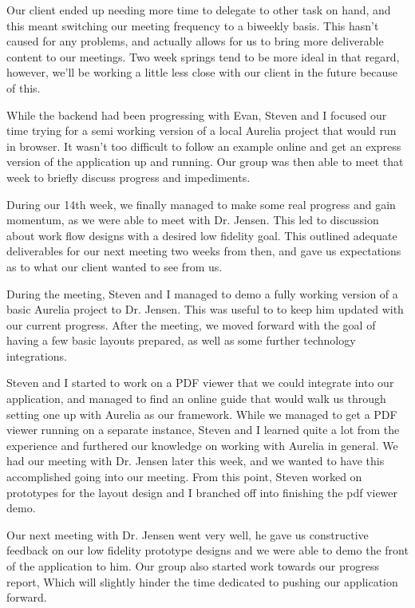 \documentclass[onecolumn, draftclsnofoot,10pt, compsoc]{IEEEtran}
\begin{document}
Our client ended up needing more time to delegate to other task on hand, and this meant 
switching our meeting frequency to a biweekly basis. This hasn't caused for any problems,
and actually allows for us to bring more deliverable content to our meetings. Two week 
springs tend to be more ideal in that regard, however, we'll be working a little less 
close with our client in the future because of this. 

While the backend had been progressing with Evan, Steven and I focused our time trying for 
a semi working version of a local Aurelia project that would run in browser. It wasn't too
difficult to follow an example online and get an express version of the application up and 
running. Our group was then able to meet that week to briefly discuss progress and 
impediments. 

During our 14th week, we finally managed to make some real progress and gain momentum, as 
we were able to meet with Dr. Jensen. This led to discussion about work flow designs with a 
desired low fidelity goal. This outlined adequate deliverables for our next meeting two weeks 
from then, and gave us expectations as to what our client wanted to see from us. 

During the meeting, Steven and I managed to demo a fully working version of a basic Aurelia 
project to Dr. Jensen. This was useful to to keep him updated with our current progress. After 
the meeting, we moved forward with the goal of having a few basic layouts prepared, as well 
as some further technology integrations. 

Steven and I started to work on a PDF viewer that we could integrate into our application, 
and managed to find an online guide that would walk us through setting one up with Aurelia 
as our framework. While we managed to get a PDF viewer running on a separate instance, Steven 
and I learned quite a lot from the experience and furthered our knowledge on working with 
Aurelia in general. We had our meeting with Dr. Jensen later this week, and we wanted to have 
this accomplished going into our meeting. From this point, Steven worked on prototypes for 
the layout design and I branched off into finishing the pdf viewer demo. 

Our next meeting with Dr. Jensen went very well, he gave us constructive feedback on our low 
fidelity prototype designs and we were able to demo the front of the application to him. 
Our group also started work towards our progress report, Which will slightly hinder the time 
dedicated to pushing our application forward.
\end{document}
